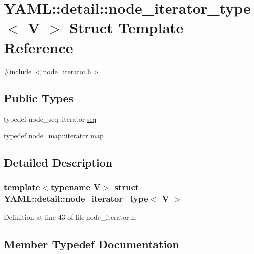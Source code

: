 \hypertarget{struct_y_a_m_l_1_1detail_1_1node__iterator__type}{}\section{Y\+A\+ML\+::detail\+::node\+\_\+iterator\+\_\+type$<$ V $>$ Struct Template Reference}
\label{struct_y_a_m_l_1_1detail_1_1node__iterator__type}


{\ttfamily \#include $<$node\+\_\+iterator.\+h$>$}

\subsection*{Public Types}
\begin{DoxyCompactItemize}
\item 
typedef node\+\_\+seq\+::iterator \mbox{\hyperlink{struct_y_a_m_l_1_1detail_1_1node__iterator__type_adcd831b5b83d2cd845630e44ca6a1e5b}{seq}}
\item 
typedef node\+\_\+map\+::iterator \mbox{\hyperlink{struct_y_a_m_l_1_1detail_1_1node__iterator__type_a4c095a4c94bb4ad28550077bfe8a9e76}{map}}
\end{DoxyCompactItemize}


\subsection{Detailed Description}
\subsubsection*{template$<$typename V$>$\newline
struct Y\+A\+M\+L\+::detail\+::node\+\_\+iterator\+\_\+type$<$ V $>$}



Definition at line 43 of file node\+\_\+iterator.\+h.



\subsection{Member Typedef Documentation}
\mbox{\label{struct_y_a_m_l_1_1detail_1_1node__iterator__type_a4c095a4c94bb4ad28550077bfe8a9e76}} 
